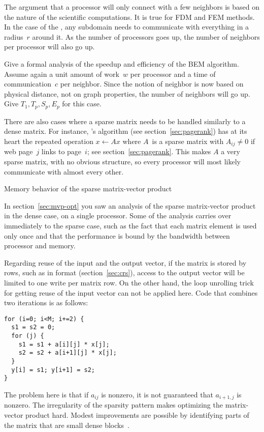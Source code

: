 The argument that a processor will only connect with a few neighbors
is based on the nature of the scientific computations. It is true for
\ac{FDM} and \ac{FEM} methods.
In the case
of the , any subdomain needs to communicate with
everything in a radius~$r$ around it. As the number of processors goes
up, the number of neighbors per processor will also go up.

\begin{exercise}
  Give a formal analysis of the speedup and efficiency of the \ac{BEM}
  algorithm. Assume again a unit amount of work~$w$ per processor and
  a time of communication~$c$ per neighbor. Since the notion of
  neighbor is now based on physical distance, not on graph
  properties, the number of neighbors will go up. Give
  $T_1,T_p,S_p,E_p$ for this case.
\end{exercise}

There are also cases where a sparse matrix needs to be handled
similarly to a dense matrix. For instance, 's
 algorithm (see section~\ref{sec:pagerank}) has at its
heart the repeated operation $x\leftarrow Ax$ where $A$~is a sparse
matrix with $A_{ij}\not=0$ if web page~$j$ links to page~$i$; see
section~\ref{sec:pagerank}. This makes $A$ a very sparse matrix, with
no obvious structure, so every processor will most likely communicate
with almost every other.


 {Memory behavior of the sparse matrix-vector product}

In section~\ref{sec:mvp-opt} you saw an analysis of the sparse
matrix-vector product in the dense case, on a single processor. Some
of the analysis carries over immediately to the sparse case, such as
the fact that each matrix element is used only once and that the
performance is bound by the bandwidth between processor and memory.

Regarding reuse of the input and the output vector, if the matrix is
stored by rows, such as in  format (section~\ref{sec:crs}),
access to the output vector will be limited to one write per matrix
row.
On the other hand, the loop unrolling
trick for getting reuse of the input vector can not be applied
here. Code that combines two iterations is as follows:
\begin{verbatim}
for (i=0; i<M; i+=2) {
  s1 = s2 = 0;
  for (j) {
    s1 = s1 + a[i][j] * x[j];
    s2 = s2 + a[i+1][j] * x[j];
  }
  y[i] = s1; y[i+1] = s2;
}
\end{verbatim}
The problem here is that if $a_{ij}$ is nonzero, it is not guaranteed
that $a_{i+1,j}$ is nonzero. The irregularity of the sparsity pattern
makes optimizing the matrix-vector product hard. Modest improvements
are possible by identifying parts of the matrix that are small dense
blocks~\cite{ButtEijkLang:spmvp,DemEtAl:ieeeproc2004,oski}.

